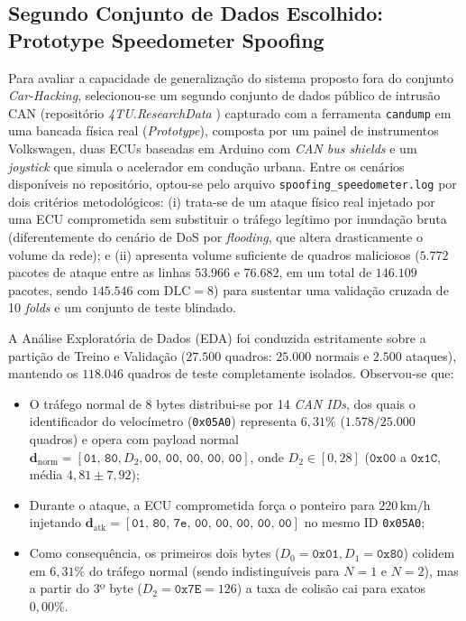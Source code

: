 \documentclass[conference]{IEEEtran}
\begin{document}
\subsection{Segundo Conjunto de Dados Escolhido: Prototype Speedometer Spoofing}
Para avaliar a capacidade de generalização do sistema proposto fora do conjunto \textit{Car-Hacking}, selecionou-se um segundo conjunto de dados público de intrusão CAN (repositório \textit{4TU.ResearchData} \cite{fourtu_can_dataset}) capturado com a ferramenta \texttt{candump} em uma bancada física real (\textit{Prototype}), composta por um painel de instrumentos Volkswagen, duas ECUs baseadas em Arduino com \textit{CAN bus shields} e um \textit{joystick} que simula o acelerador em condução urbana. Entre os cenários disponíveis no repositório, optou-se pelo arquivo \texttt{spoofing\_speedometer.log} por dois critérios metodológicos: (i) trata-se de um ataque físico real injetado por uma ECU comprometida sem substituir o tráfego legítimo por inundação bruta (diferentemente do cenário de DoS por \textit{flooding}, que altera drasticamente o volume da rede); e (ii) apresenta volume suficiente de quadros maliciosos ($5.772$ pacotes de ataque entre as linhas $53.966$ e $76.682$, em um total de $146.109$ pacotes, sendo $145.546$ com $\text{DLC}=8$) para sustentar uma validação cruzada de 10 \textit{folds} e um conjunto de teste blindado.

A Análise Exploratória de Dados (EDA) foi conduzida estritamente sobre a partição de Treino e Validação ($27.500$ quadros: $25.000$ normais e $2.500$ ataques), mantendo os $118.046$ quadros de teste completamente isolados. Observou-se que:
\begin{itemize}
    \item O tráfego normal de 8 bytes distribui-se por 14 \textit{CAN IDs}, dos quais o identificador do velocímetro (\texttt{0x05A0}) representa $6{,}31\%$ ($1.578/25.000$ quadros) e opera com payload normal $\mathbf{d}_{\text{norm}} = [\texttt{01, 80}, D_2, \texttt{00, 00, 00, 00, 00}]$, onde $D_2 \in [0, 28]$ ($\texttt{0x00}$ a $\texttt{0x1C}$, média $4{,}81 \pm 7{,}92$);
    \item Durante o ataque, a ECU comprometida força o ponteiro para $220\,\text{km/h}$ injetando $\mathbf{d}_{\text{atk}} = [\texttt{01, 80, 7e, 00, 00, 00, 00, 00}]$ no mesmo ID \texttt{0x05A0};
    \item Como consequência, os primeiros dois bytes ($D_0=\texttt{0x01}, D_1=\texttt{0x80}$) colidem em $6{,}31\%$ do tráfego normal (sendo indistinguíveis para $N=1$ e $N=2$), mas a partir do 3º byte ($D_2=\texttt{0x7E}=126$) a taxa de colisão cai para exatos $0{,}00\%$.
\end{itemize}
\end{document}
